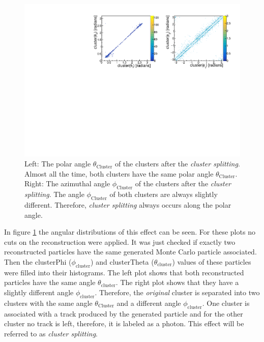 \documentclass[a4paper,11pt,twosided,final,german,openbib,pdftex,listof=totoc,bibliography=totoc]{scrbook}
\begin{document}
\begin{figure}[h!]
	\centering
	\includegraphics[width=\textwidth]{AnhangPlots/ttpp.pdf}
	\caption[Cluster Splitting Angle Distribution]{Left: The polar angle $\theta_{\textrm{Cluster}}$ of the clusters after the \textit{cluster splitting}. Almost all the time, both clusters have the same polar angle $\theta_{\textrm{Cluster}}$.  Right: The azimuthal angle $\phi_{\textrm{Cluster}}$ of the clusters after the \textit{cluster splitting}. The angle $\phi_{\textrm{Cluster}}$ of both clusters are always slightly different. Therefore, \textit{cluster splitting} always occurs along the polar angle.}
	\label{fig:clusterSplittingAngle}
\end{figure}








In figure \ref{fig:clusterSplittingAngle} the angular distributions of this effect can be seen. For these plots no cuts on the reconstruction were applied. It was just checked if exactly two reconstructed particles have the same generated Monte Carlo particle associated. Then the clusterPhi ($\phi_{\textrm{cluster}}$) and clusterTheta ($\theta_{\textrm{cluster}}$) values of these particles were filled into their histograms. The left plot shows that both reconstructed particles have the same angle $\theta_{\textrm{cluster}}$. The right plot shows that they have a slightly different angle $\phi_{\textrm{cluster}}$. Therefore, the \textit{original} cluster  is separated into two clusters with the same angle $\theta_{\textrm{Cluster}}$ and a different angle $\phi_{\textrm{cluster}}$. One cluster is associated with a track produced by the generated particle and for the other cluster no track is left, therefore, it is labeled as a photon. This effect will be referred to as \textit{cluster splitting}.
\end{document}
